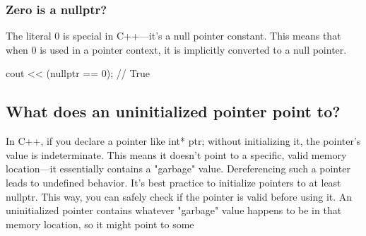 \documentclass{report}
\begin{document}
    \bigbreak \noindent 
    \subsubsection{Zero is a nullptr?}
    \bigbreak \noindent 
    The literal 0 is special in C++—it’s a null pointer constant. This means that when 0 is used in a pointer context, it is implicitly converted to a null pointer.
    \bigbreak \noindent 
    \begin{cppcode}
    cout << (nullptr == 0); // True
    \end{cppcode}

    \bigbreak \noindent 
    \subsection{What does an uninitialized pointer point to?}
    \bigbreak \noindent 
    In C++, if you declare a pointer like int* ptr; without initializing it, the pointer's value is indeterminate. This means it doesn't point to a specific, valid memory location—it essentially contains a "garbage" value. Dereferencing such a pointer leads to undefined behavior. It's best practice to initialize pointers to at least nullptr. This way, you can safely check if the pointer is valid before using it.
    \bigbreak \noindent 
    An uninitialized pointer contains whatever "garbage" value happens to be in that memory location, so it might point to some































    





    
\end{document}
